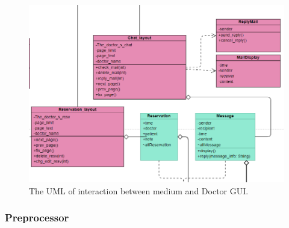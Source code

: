 \documentclass{article}
\begin{document}
\begin{figure}[ht]
  \centering
  \includegraphics[scale = 0.35]{asset/frontend_and_medium/MED_usage_doctor_gui.png}
  \caption{The UML of interaction between medium and Doctor GUI.}
  \label{fig:uml_medium_and_doctor_gui}
\end{figure}

\subsubsection*{Preprocessor}
\end{document}
